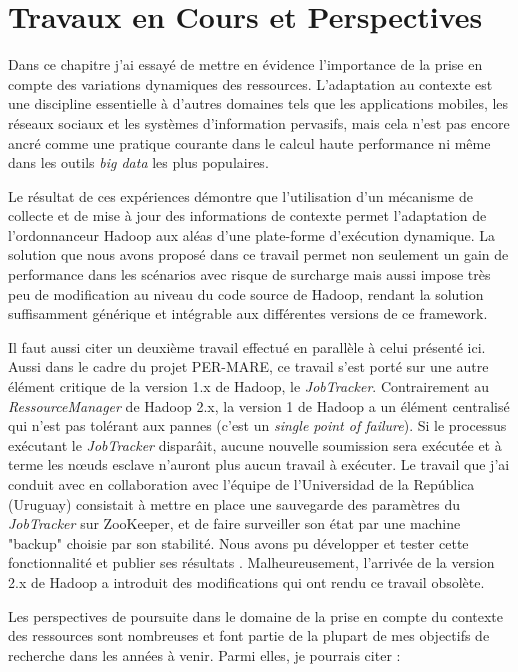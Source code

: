 \section{Travaux en Cours et Perspectives} \label{sec:disc}

Dans ce chapitre j'ai essayé de mettre en évidence l'importance de la prise en compte des variations dynamiques des ressources. L'adaptation au contexte est une discipline essentielle à d'autres domaines tels que les applications mobiles, les réseaux sociaux et les systèmes d'information pervasifs, mais cela n'est pas encore ancré comme une pratique courante dans le calcul haute performance ni même dans les outils \textit{big data} les plus populaires. 

Le résultat de ces expériences démontre que l'utilisation d'un mécanisme de collecte et de mise à jour des informations de contexte permet l'adaptation de l'ordonnanceur Hadoop aux aléas d'une plate-forme d'exécution dynamique. La solution que nous avons proposé dans ce travail permet non seulement un gain de performance dans les scénarios avec risque de surcharge mais aussi impose très peu de modification au niveau du code source de Hadoop, rendant la solution suffisamment générique et intégrable aux différentes versions de ce framework. 

Il faut aussi citer un deuxième travail effectué en parallèle à celui présenté ici. Aussi dans le cadre du projet PER-MARE, ce travail s'est porté sur une autre élément critique de la version 1.x de Hadoop, le \textit{JobTracker}. Contrairement au \textit{RessourceManager} de Hadoop 2.x, la version 1 de Hadoop a un élément centralisé qui n'est pas tolérant aux pannes (c'est un \textit{single point of failure}). Si le processus exécutant le \textit{JobTracker} disparâit, aucune nouvelle soumission sera exécutée et à terme les n{\oe}uds esclave n'auront plus aucun travail à exécuter. Le travail que j'ai conduit avec en collaboration avec l'équipe de l'Universidad de la República (Uruguay) consistait à mettre en place une sauvegarde des paramètres du \textit{JobTracker} sur ZooKeeper, et de faire surveiller son état par une machine "backup" choisie par son stabilité. Nous avons pu développer et tester cette fonctionnalité et publier ses résultats \cite{Steffenel2015-WoC, Rey14a}. Malheureusement, l'arrivée de la version 2.x de Hadoop a introduit des modifications qui ont rendu ce travail obsolète. 

Les perspectives de poursuite dans le domaine de la prise en compte du contexte des ressources sont nombreuses et font partie de la plupart de mes objectifs de recherche dans les années à venir. Parmi elles, je pourrais citer :

